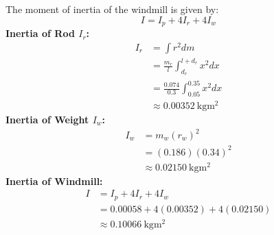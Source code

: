 \documentclass[article, 11pt]{article}
\begin{document}
    \begin{comment}
    \textbf{Moment of Inertia of Rod $I_\text{rod}$:}
    \begin{align*}
        I_r &= \int r^2 dm \\
            &= \frac{m_r}{l} \int_{d_r}^{l + d_r} {x^2 dx} \\
            &= \frac{0.074}{0.3} \int_{0.05}^{0.35} {x^2 dx} \\
            &\approx 0.003515
    \end{align*}
    \textbf{Moment of Inertia of Weight $I_\text{weight}$:}
    \begin{align*}
    \intertext{The inertia of a point mass is given by $I = mr^2$}
        I_w &= m_w(r_w)^2 \\
            &= (0.186)(0.34)^2 \\
            &\approx 0.0215
    \end{align*}
    \textbf{Parallel Axis Contribution $I_\text{parallel axis contribution}$:}
    \begin{align*}
        I_\text{pac} &= m_w(d_w)^2 \\
            &= (0.186)(0.33)^2 \\
            &\approx 0.0203
    \end{align*}
    \textbf{Moment of Inertia of Windmill:}
    \begin{align*}
        I &= I_{\text{pulley}} + 4I_{\text{rod}} + 4I_{\text{weight}} + 4I_{\text{parallel axis contribution}} \\
            &= 0.00058 + 4(0.003515) + 4(0.0215) + 4(0.0203) \\
            &\approx 0.18184
    \end{align*}
    \end{comment}
    
    The moment of inertia of the windmill is given by:
    \begin{equation*}
        I = I_p + 4I_r + 4I_w 
    \end{equation*}
    \textbf{Inertia of Rod $I_r$:} 
    \begin{align*}
        I_r &= \int r^2 dm \\
            &= \frac{m_r}{l} \int_{d_r}^{l + d_r} {x^2 dx} \\
            &= \frac{0.074}{0.3} \int_{0.05}^{0.35} {x^2 dx} \\
            &\approx \SI{0.00352}{\kilogram\meter^2}
    \end{align*}
    \textbf{Inertia of Weight $I_w$:}
    \begin{align*}
        I_w &= m_w(r_w)^2 \\
            &= (0.186)(0.34)^2 \\
            &\approx \SI{0.02150}{\kilogram\meter^2}
    \end{align*}
    \textbf{Inertia of Windmill:}
    \begin{align*}
        I &= I_p + 4I_r + 4I_w \\
            &= 0.00058 + 4(0.00352) + 4(0.02150) \\
            &\approx \SI{0.10066}{\kilogram\meter^2}
    \end{align*}
\end{document}

